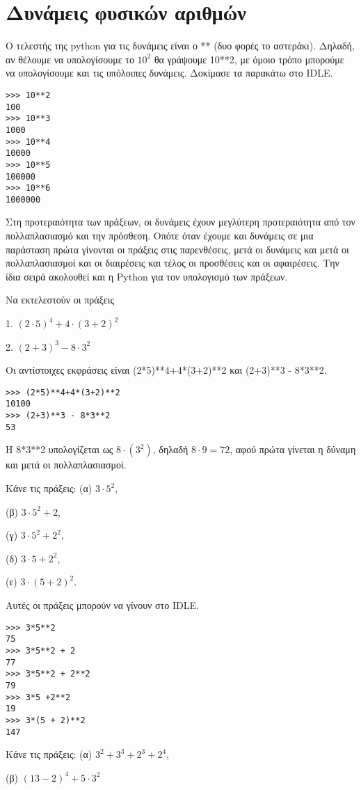 \section{Δυνάμεις φυσικών αριθμών}
Ο τελεστής της python για τις δυνάμεις είναι ο **  (δυο φορές το αστεράκι). Δηλαδή, αν θέλουμε να υπολογίσουμε το $10^2$ θα γράψουμε 10**2, με όμοιο τρόπο μπορούμε να υπολογίσουμε και τις υπόλοιπες δυνάμεις. Δοκίμασε τα παρακάτω στο IDLE.
\begin{lstlisting}
>>> 10**2
100
>>> 10**3
1000
>>> 10**4
10000
>>> 10**5
100000
>>> 10**6
1000000
\end{lstlisting}
Στη προτεραιότητα των πράξεων, οι δυνάμεις έχουν μεγλύτερη προτεραιότητα από τον πολλαπλασιασμό και την πρόσθεση. Οπότε όταν έχουμε και δυνάμεις σε μια παράσταση πρώτα γίνονται οι πράξεις στις παρενθέσεις, μετά οι δυνάμεις και μετά οι πολλαπλασιασμοί και οι διαιρέσεις και τέλος οι προσθέσεις και οι αφαιρέσεις. Την ίδια σειρά ακολουθεί και η Python για τον υπολογισμό των πράξεων.
\begin{exercise}
Να εκτελεστούν οι πράξεις 

 1. $(2\cdot 5)^4+4\cdot (3+2)^2$

 2. $(2+3)^3 - 8\cdot 3^2$

\end{exercise}
Οι αντίστοιχες εκφράσεις είναι (2*5)**4+4*(3+2)**2 και (2+3)**3 - 8*3**2.

\begin{lstlisting}
>>> (2*5)**4+4*(3+2)**2
10100
>>> (2+3)**3 - 8*3**2
53
\end{lstlisting}
H 8*3**2 υπολογίζεται ως $8\cdot (3^2)$, δηλαδή $8\cdot 9 = 72$, αφού πρώτα γίνεται η δύναμη και μετά οι πολλαπλασιασμοί.

\begin{exercise}
Κάνε τις πράξεις: 
(α) $3\cdot 5^2$, 

(β) $3\cdot 5^2 + 2$, 

(γ) $3\cdot5^2 + 2^2$, 

(δ) $3\cdot 5 + 2^2$, 

(ε) $3\cdot(5 + 2)^2$.
\end{exercise}

Αυτές οι πράξεις μπορούν να γίνουν στο IDLE.
\begin{lstlisting}
>>> 3*5**2
75
>>> 3*5**2 + 2
77
>>> 3*5**2 + 2**2
79
>>> 3*5 +2**2
19
>>> 3*(5 + 2)**2
147
\end{lstlisting}

\begin{exercise}
Κάνε τις πράξεις: 
(α) $3^2 +3^3 +2^3 +2^4$, 

(β) $(13-2)^ 4 + 5\cdot 3^2$
\end{exercise}

